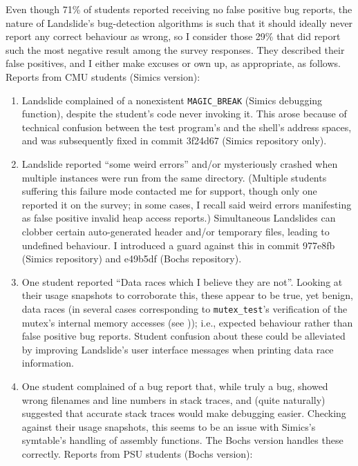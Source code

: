 Even though 71\% of students reported receiving no false positive bug reports,
the nature of Landslide's bug-detection algorithms is such
that it should ideally never report any correct behaviour as wrong,
so I consider those 29\% that did report such the most negative result among the survey responses.
They described their false positives, and I either make excuses or own up, as appropriate, as follows.
Reports from CMU students (Simics version):
\begin{enumerate}
	\item Landslide complained of a nonexistent {\tt MAGIC\_BREAK} (Simics debugging function),
		despite the student's code never invoking it.
		This arose because of technical confusion between the test program's and the shell's address spaces,
		and was subsequently fixed in commit 3f24d67 (Simics repository only).
	\item Landslide reported ``some weird errors'' and/or mysteriously crashed
		when multiple instances were run from the same directory.
		(Multiple students suffering this failure mode contacted me for support,
		though only one reported it on the survey;
		in some cases, I recall said weird errors manifesting as false positive invalid heap access reports.)
		Simultaneous Landslides can clobber certain auto-generated header and/or temporary files,
		leading to undefined behaviour.
		I introduced a guard against this in commit 977e8fb (Simics repository) and e49b5df (Bochs repository).
	\item One student reported ``Data races which I believe they are not''.
		Looking at their usage snapshots to corroborate this,
		these appear to be true, yet benign, data races
		(in several cases corresponding to {\tt mutex\_test}'s verification of the mutex's internal memory accesses
		(see \sect{\ref{sec:education-pebbles-tests}}));
		i.e., expected behaviour rather than false positive bug reports.
		Student confusion about these could be alleviated
		by improving Landslide's user interface messages when printing data race information. %
	\item One student complained of a bug report that, while truly a bug, showed wrong filenames and line numbers in stack traces,
		and (quite naturally) suggested that accurate stack traces would make debugging easier.
		Checking against their usage snapshots,
		this seems to be an issue with Simics's symtable's handling of assembly functions.
		The Bochs version handles these correctly.
Reports from PSU students (Bochs version):

\end{enumerate}
